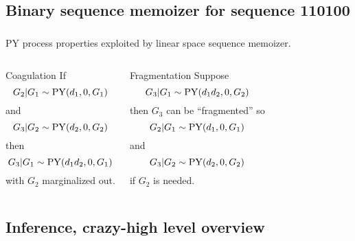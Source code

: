 \documentclass[16pt]{beamer}
\begin{document}
  \subsection{Binary sequence memoizer for  sequence 110100}

\begin{frame}[t] \frametitle{}
PY process properties exploited by linear space sequence memoizer.
\begin{columns}[c]  
\begin{block}{Coagulation \cite{Pitman1999, Ho2006}}
If \[G_2| G_1\sim\py(d_1,0,G_1)\] and \[G_3| G_2\sim\py(d_2,0,G_2)\] then
\[G_3|G_1\sim\py(d_1d_2,0,G_1)\] with $G_2$ marginalized out.
\label{thm:coag}
\end{block}
\begin{block}{Fragmentation \cite{Pitman1999, Ho2006,Wood2009}}
Suppose
 \[G_3| G_1\sim\py(d_1d_2,0,G_2)\]
 then $G_3$
 can be ``fragmented'' so 
 \[G_2 | G_1 \sim \py(d_1,0,G_1)\]
 and
  \[G_3| G_2\sim\py(d_2,0,G_2)\] 
  if $G_2$ is needed.
\end{block}
 \end{columns}
 \end{frame}

\subsection{Inference, crazy-high level overview}
\end{document}
